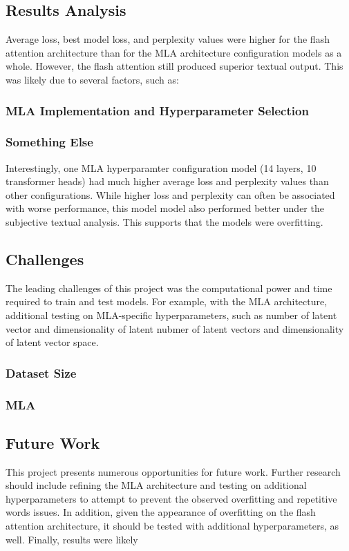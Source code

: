 
\subsection{Results Analysis}
Average loss, best model loss, and perplexity values were higher for the flash attention architecture than for the MLA architecture configuration models as a whole. However, the 
flash attention still produced superior textual output.   
This was likely due to several factors, such as:
\subsubsection{MLA Implementation and Hyperparameter Selection}



\subsubsection{Something Else}


Interestingly, one MLA hyperparamter configuration model (14 layers, 10 transformer heads) had much higher average loss and perplexity values than other configurations. 
While higher loss and perplexity can often be associated with worse performance, this model model also performed better under the subjective textual analysis.  
This supports that the models were overfitting.

\subsection{Challenges}
The leading challenges of this project was the computational power and time required to train and test models. 
For example, with the MLA architecture, additional testing on MLA-specific hyperparameters, such as number of latent vector and dimensionality of latent 
nubmer of latent vectors and dimensionality of latent vector space.  


\subsubsection{Dataset Size}

\subsubsection{MLA}



\subsection{Future Work}
This project presents numerous opportunities for future work. 
Further research should include refining the MLA architecture and testing on additional hyperparameters to attempt to prevent the observed overfitting and repetitive words issues.
In addition, given the appearance of overfitting on the flash attention architecture, it should be tested with additional hyperparameters, as well.
Finally, results were likely 
